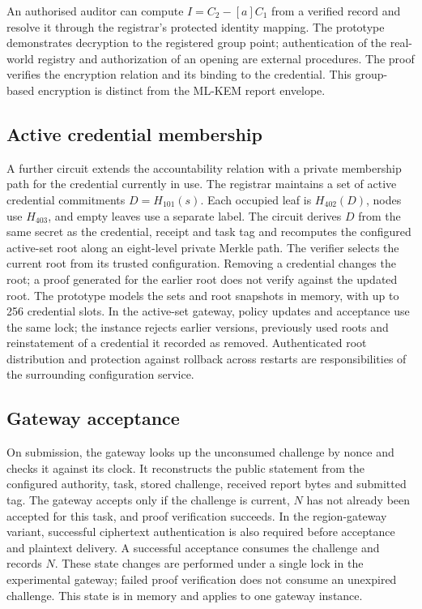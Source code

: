 \documentclass[pdflatex,iicol,sn-mathphys-num]{sn-jnl}
\begin{document}
An authorised auditor can compute $I=C_2-[a]C_1$ from a verified record and resolve it through the registrar's protected identity mapping. The prototype demonstrates decryption to the registered group point; authentication of the real-world registry and authorization of an opening are external procedures. The proof verifies the encryption relation and its binding to the credential. This group-based encryption is distinct from the ML-KEM report envelope.

\subsection{Active credential membership}
A further circuit extends the accountability relation with a private membership path for the credential currently in use. The registrar maintains a set of active credential commitments $D=H_{101}(s)$. Each occupied leaf is $H_{402}(D)$, nodes use $H_{403}$, and empty leaves use a separate label. The circuit derives $D$ from the same secret as the credential, receipt and task tag and recomputes the configured active-set root along an eight-level private Merkle path. The verifier selects the current root from its trusted configuration. Removing a credential changes the root; a proof generated for the earlier root does not verify against the updated root. The prototype models the sets and root snapshots in memory, with up to 256 credential slots. In the active-set gateway, policy updates and acceptance use the same lock; the instance rejects earlier versions, previously used roots and reinstatement of a credential it recorded as removed. Authenticated root distribution and protection against rollback across restarts are responsibilities of the surrounding configuration service.

\subsection{Gateway acceptance}
\label{sec:acceptance}

On submission, the gateway looks up the unconsumed challenge by nonce and checks it against its clock. It reconstructs the public statement from the configured authority, task, stored challenge, received report bytes and submitted tag. The gateway accepts only if the challenge is current, $N$ has not already been accepted for this task, and proof verification succeeds. In the region-gateway variant, successful ciphertext authentication is also required before acceptance and plaintext delivery. A successful acceptance consumes the challenge and records $N$. These state changes are performed under a single lock in the experimental gateway; failed proof verification does not consume an unexpired challenge. This state is in memory and applies to one gateway instance.
\end{document}
